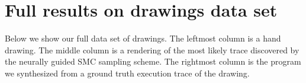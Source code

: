 \documentclass{article}
\newcommand{\probability}{\mathds{P}} %
\begin{document}




\section{Full results on drawings data set}

Below we show our full data set of drawings. The leftmost column is a hand drawing. The middle column is a rendering of the most likely trace discovered by the neurally guided SMC sampling scheme. The rightmost column is the program we synthesized from a ground truth execution trace of the drawing.






{\small }
 
\end{document}
